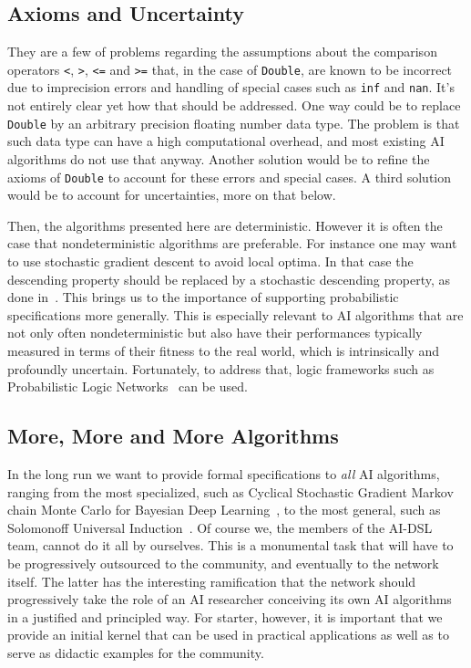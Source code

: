 \documentclass[]{report}
\begin{document}
\subsection{Axioms and Uncertainty}
They are a few of problems regarding the assumptions about the
comparison operators \texttt{<}, \texttt{>}, \texttt{<=} and
\texttt{>=} that, in the case of \texttt{Double}, are known to be
incorrect due to imprecision errors and handling of special cases such
as \texttt{inf} and \texttt{nan}.  It's not entirely clear yet how
that should be addressed.  One way could be to replace \texttt{Double}
by an arbitrary precision floating number data type.  The problem is
that such data type can have a high computational overhead, and most
existing AI algorithms do not use that anyway.  Another solution would
be to refine the axioms of \texttt{Double} to account for these errors
and special cases.  A third solution would be to account for
uncertainties, more on that below.

Then, the algorithms presented here are deterministic.  However it is
often the case that nondeterministic algorithms are preferable.  For
instance one may want to use stochastic gradient descent to avoid
local optima.  In that case the descending property should be replaced
by a stochastic descending property, as done
in~\cite{DBLP:journals/corr/SelsamLD17}.  This brings us to the
importance of supporting probabilistic specifications more generally.
This is especially relevant to AI algorithms that are not only often
nondeterministic but also have their performances typically measured
in terms of their fitness to the real world, which is intrinsically
and profoundly uncertain.  Fortunately, to address that, logic
frameworks such as Probabilistic Logic Networks~\cite{Goertzel09PLN}
can be used.

\subsection{More, More and More Algorithms}
In the long run we want to provide formal specifications to \emph{all}
AI algorithms, ranging from the most specialized, such as Cyclical
Stochastic Gradient Markov chain Monte Carlo for Bayesian Deep
Learning~\cite{Zhang2020}, to the most general, such as Solomonoff
Universal Induction~\cite{Solomonoff1964}.  Of course we, the members
of the AI-DSL team, cannot do it all by ourselves.  This is a
monumental task that will have to be progressively outsourced to the
community, and eventually to the network itself.  The latter has the
interesting ramification that the network should progressively take
the role of an AI researcher conceiving its own AI algorithms in a
justified and principled way.  For starter, however, it is important
that we provide an initial kernel that can be used in practical
applications as well as to serve as didactic examples for the
community.
\end{document}
